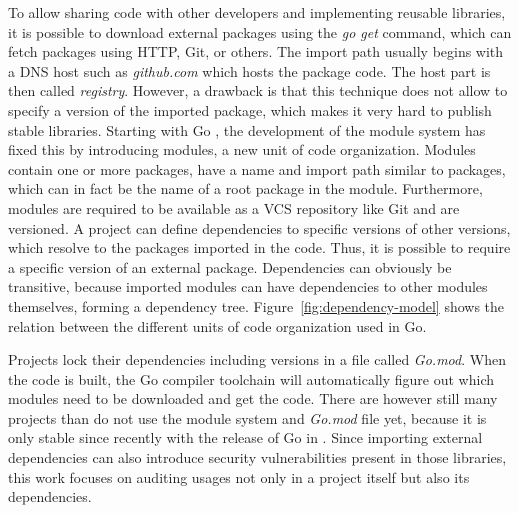 To allow sharing code with other developers and implementing reusable libraries, it is possible to download external
packages using the \textit{go get} command, which can fetch packages using \acrshort{HTTP}, Git, or others.
The import path usually begins with a \acrshort{DNS} host such as \textit{github.com} which hosts the package code.
The host part is then called \textit{registry}.
However, a drawback is that this technique does not allow to specify a version of the imported package, which makes it
very hard to publish stable libraries.
Starting with Go , the development of the module system has fixed this by introducing modules, a new unit
of code organization.
Modules contain one or more packages, have a name and import path similar to packages, which can in fact be the name of
a root package in the module.
Furthermore, modules are required to be available as a \acrshort{VCS} repository like Git and are versioned.
A project can define dependencies to specific versions of other versions, which resolve to the packages imported in the
code.
Thus, it is possible to require a specific version of an external package.
Dependencies can obviously be transitive, because imported modules can have dependencies to other modules themselves,
forming a dependency tree.
Figure~\ref{fig:dependency-model} shows the relation between the different units of code organization used in Go.



Projects lock their dependencies including versions in a file called \textit{Go.mod}.
When the code is built, the Go compiler toolchain will automatically figure out which modules need to be downloaded and
get the code.
There are however still many projects than do not use the module system and \textit{Go.mod} file yet, because it is only
stable since recently with the release of Go  in .
Since importing external dependencies can also introduce security vulnerabilities present in those libraries, this work
focuses on auditing \unsafe{} usages not only in a project itself but also its dependencies.
